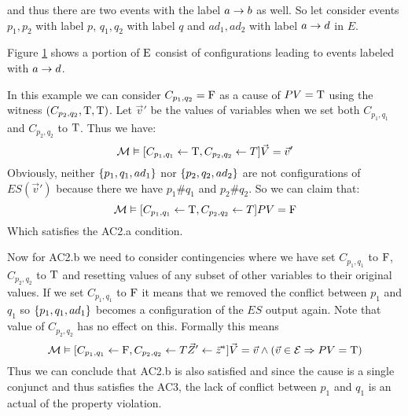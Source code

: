 \begin{example}
    and thus there are two events with the label $a \rightarrow b$ as well.
    So let consider events $p_1,p_2$ with label $p$,
    $q_1,q_2$ with label $q$ and $ad_1,ad_2$ with label $a \rightarrow d$ 
    in $E$.
    \begin{figure}
        \centering
        \caption{}
        \label{fig:blacklist:es}
    \end{figure}
    Figure \ref{fig:blacklist:es} shows a portion of $\mathrm{E}$ consist of
    configurations leading to events labeled with $a\rightarrow d$.

    In this example we can consider $C_{p_1,q_2} = \mathrm{F}$ as a cause of 
    $PV = \mathrm{T}$ using the witness $(C_{p_2,q_2},\mathrm{T},\mathrm{T})$.
    Let $\vec v'$ be the values of variables when we set both 
    $C_{p_1,q_1}$ and $C_{p_2,q_2}$ to $\mathrm{T}$.
    Thus we have:
    \begin{equation*}
        \mathcal{M} \vDash [C_{p_1,q_1} \leftarrow \mathrm{T}, C_{p_2,q_2} \leftarrow T] 
        \vec V = \vec v'
    \end{equation*}
    Obviously, neither $\{p_1,q_1,ad_1\}$ nor $\{p_2,q_2,ad_2\}$ 
    are not configurations of $ES(\vec v')$ because there we have
    $p_1 \# q_1$ and $p_2 \# q_2$. 
    So we can claim that:
    \begin{equation*}
        \mathcal{M} \vDash [C_{p_1,q_1} \leftarrow \mathrm{T}, C_{p_2,q_2} \leftarrow T] 
        PV = \mathrm{F}
    \end{equation*}
    Which satisfies the AC2.a condition.

    Now for AC2.b we need to consider contingencies where we have
    set $C_{p_1,q_1}$ to $\mathrm{F}$, $C_{p_2,q_2}$ to $\mathrm{T}$ and resetting 
    values of any subset of other variables to their original values.
    If we set $C_{p_1,q_1}$ to $\mathrm{F}$ it means that we removed
    the conflict between $p_1$ and $q_1$ so $\{p_1,q_1,ad_1\}$ becomes
    a configuration of the $ES$ output again.
    Note that value of $C_{p_2,q_2}$ has no effect on this.
    Formally this means
    \begin{equation*}
        \mathcal{M} \vDash [C_{p_1,q_1} \leftarrow \mathrm{F}, C_{p_2,q_2} \leftarrow T
            \vec Z' \leftarrow \vec z^*
        ] \vec V = \vec v \wedge 
        (\vec v \in \mathcal{E} \Rightarrow PV = \mathrm{T})
    \end{equation*}
    Thus we can conclude that AC2.b is also satisfied and since the 
    cause is a single conjunct and thus satisfies the AC3, 
    the lack of conflict between $p_1$ and $q_1$ is an actual of 
    the property violation. 


\end{example}